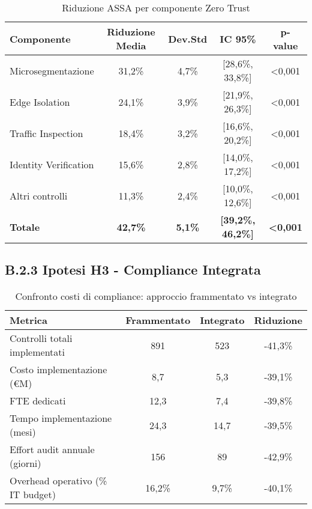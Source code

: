 \begin{table}[htbp]
\centering
\caption{Riduzione ASSA per componente Zero Trust}
\label{tab:assa_reduction_appendix}
\begin{tabular}{lcccc}
\toprule
\textbf{Componente} & \textbf{Riduzione Media} & \textbf{Dev.Std} & \textbf{IC 95\%} & \textbf{p-value} \\
\midrule
Microsegmentazione & 31,2\% & 4,7\% & [28,6\%, 33,8\%] & <0,001 \\
Edge Isolation & 24,1\% & 3,9\% & [21,9\%, 26,3\%] & <0,001 \\
Traffic Inspection & 18,4\% & 3,2\% & [16,6\%, 20,2\%] & <0,001 \\
Identity Verification & 15,6\% & 2,8\% & [14,0\%, 17,2\%] & <0,001 \\
Altri controlli & 11,3\% & 2,4\% & [10,0\%, 12,6\%] & <0,001 \\
\midrule
\textbf{Totale} & \textbf{42,7\%} & \textbf{5,1\%} & \textbf{[39,2\%, 46,2\%]} & \textbf{<0,001} \\
\bottomrule
\end{tabular}
\end{table}

\subsection{\texorpdfstring{\textbf{B.2.3 Ipotesi H3 - Compliance Integrata}}{B.2.3 - Ipotesi H3 - Compliance Integrata}}

\begin{table}[htbp]
\centering
\caption{Confronto costi di compliance: approccio frammentato vs integrato}
\label{tab:compliance_costs}
\begin{tabular}{lccc}
\toprule
\textbf{Metrica} & \textbf{Frammentato} & \textbf{Integrato} & \textbf{Riduzione} \\
\midrule
Controlli totali implementati & 891 & 523 & -41,3\% \\
Costo implementazione (€M) & 8,7 & 5,3 & -39,1\% \\
FTE dedicati & 12,3 & 7,4 & -39,8\% \\
Tempo implementazione (mesi) & 24,3 & 14,7 & -39,5\% \\
Effort audit annuale (giorni) & 156 & 89 & -42,9\% \\
Overhead operativo (\% IT budget) & 16,2\% & 9,7\% & -40,1\% \\
\bottomrule
\end{tabular}
\end{table}

